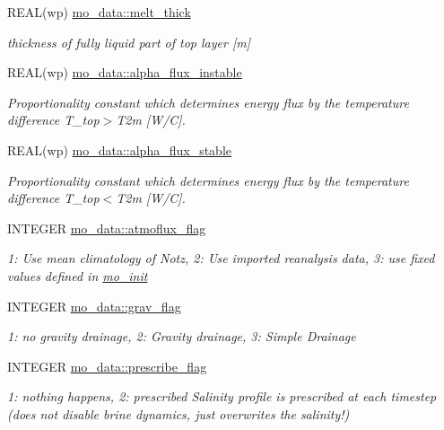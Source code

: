\begin{DoxyCompactItemize}
REAL(wp) \hyperlink{namespacemo__data_ae1057f6ef957e6cae0ac381add3f3b73}{mo\_\-data::melt\_\-thick}
\begin{DoxyCompactList}\small\item\em thickness of fully liquid part of top layer \mbox{[}m\mbox{]} \item\end{DoxyCompactList}\item 
REAL(wp) \hyperlink{namespacemo__data_a14ac53f7afeb8965106ee70871b38006}{mo\_\-data::alpha\_\-flux\_\-instable}
\begin{DoxyCompactList}\small\item\em Proportionality constant which determines energy flux by the temperature difference T\_\-top$>$T2m \mbox{[}W/C\mbox{]}. \item\end{DoxyCompactList}\item 
REAL(wp) \hyperlink{namespacemo__data_a5d103f2250083f57def04a08d89be231}{mo\_\-data::alpha\_\-flux\_\-stable}
\begin{DoxyCompactList}\small\item\em Proportionality constant which determines energy flux by the temperature difference T\_\-top$<$T2m \mbox{[}W/C\mbox{]}. \item\end{DoxyCompactList}\item 
INTEGER \hyperlink{namespacemo__data_ac3bc82dac4d101806cd2a77f3b23d92c}{mo\_\-data::atmoflux\_\-flag}
\begin{DoxyCompactList}\small\item\em 1: Use mean climatology of Notz, 2: Use imported reanalysis data, 3: use fixed values defined in \hyperlink{namespacemo__init}{mo\_\-init} \item\end{DoxyCompactList}\item 
INTEGER \hyperlink{namespacemo__data_ac9c9cead6d68b7413f41e70c9038e9c7}{mo\_\-data::grav\_\-flag}
\begin{DoxyCompactList}\small\item\em 1: no gravity drainage, 2: Gravity drainage, 3: Simple Drainage \item\end{DoxyCompactList}\item 
INTEGER \hyperlink{namespacemo__data_af60329c080a609cfb936b65d8a62e70c}{mo\_\-data::prescribe\_\-flag}
\begin{DoxyCompactList}\small\item\em 1: nothing happens, 2: prescribed Salinity profile is prescribed at each timestep (does not disable brine dynamics, just overwrites the salinity!) \item\end{DoxyCompactList}\item 

\end{DoxyCompactItemize}
